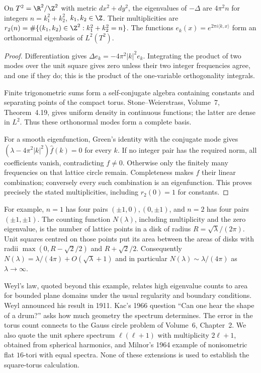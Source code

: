 \begin{theorem}\label{thm:torusspectrum}
On $T^2=\R^2/\Z^2$ with metric $dx^2+dy^2$, the eigenvalues of $-\Delta$ are $4\pi^2n$ for integers $n=k_1^2+k_2^2$, $k_1,k_2\in\Z$. Their multiplicities are
$r_2(n)=\#\{(k_1,k_2)\in\Z^2:k_1^2+k_2^2=n\}$. The functions $e_k(x)=e^{2\pi i\langle k,x\rangle}$ form an orthonormal eigenbasis of $L^2(T^2)$.
\end{theorem}

\begin{proof}
Differentiation gives $\Delta e_k=-4\pi^2|k|^2e_k$. Integrating the product of two modes over the unit square gives zero unless their two integer frequencies agree, and one if they do; this is the product of the one-variable orthogonality integrals.

Finite trigonometric sums form a self-conjugate algebra containing constants and separating points of the compact torus. Stone--Weierstrass, Volume~7, Theorem~4.19, gives uniform density in continuous functions; the latter are dense in $L^2$. Thus these orthonormal modes form a complete basis.

For a smooth eigenfunction, Green's identity with the conjugate mode gives
$(\lambda-4\pi^2|k|^2)\hat f(k)=0$ for every $k$. If no integer pair has the required norm, all coefficients vanish, contradicting $f\ne0$. Otherwise only the finitely many frequencies on that lattice circle remain. Completeness makes $f$ their linear combination; conversely every such combination is an eigenfunction. This proves precisely the stated multiplicities, including $r_2(0)=1$ for constants.
\end{proof}

For example, $n=1$ has four pairs $(\pm1,0),(0,\pm1)$, and $n=2$ has four pairs $(\pm1,\pm1)$. The counting function $N(\lambda)$, including multiplicity and the zero eigenvalue, is the number of lattice points in a disk of radius $R=\sqrt\lambda/(2\pi)$. Unit squares centred on those points put its area between the areas of disks with radii $\max(0,R-\sqrt2/2)$ and $R+\sqrt2/2$. Consequently $N(\lambda)=\lambda/(4\pi)+O(\sqrt\lambda+1)$ and in particular $N(\lambda)\sim\lambda/(4\pi)$ as $\lambda\to\infty$.

\begin{remark}
Weyl's law, quoted beyond this example, relates high eigenvalue counts to area for bounded plane domains under the usual regularity and boundary conditions. Weyl announced his result in 1911. Kac's 1966 question ``Can one hear the shape of a drum?'' asks how much geometry the spectrum determines. The error in the torus count connects to the Gauss circle problem of Volume~6, Chapter~2. We also quote the unit sphere spectrum $\ell(\ell+1)$ with multiplicity $2\ell+1$, obtained from spherical harmonics, and Milnor's 1964 example of nonisometric flat $16$-tori with equal spectra. None of these extensions is used to establish the square-torus calculation.
\end{remark}

